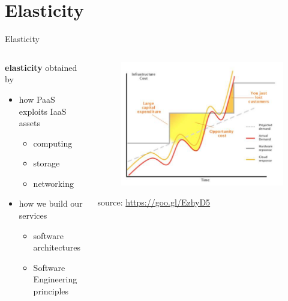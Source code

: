 %
%
\section{Elasticity}
\begin{frame}{Elasticity}
	\begin{columns}
		\begin{column}{0.5\textwidth}
			\textbf{elasticity} obtained by
			\begin{itemize}
				\item{\footnotesize{how PaaS exploits IaaS assets}}
				\begin{itemize}
					\item{\scriptsize{computing}}
					\item{\scriptsize{storage}}
					\item{\scriptsize{networking}}
				\end{itemize}
				\item{\footnotesize{how we build our services}}
				\begin{itemize}
					\item{\scriptsize{software architectures}}
					\item{\scriptsize{Software Engineering principles}}
				\end{itemize}
			\end{itemize}
		\end{column}
		\begin{column}{0.5\textwidth}
			\begin{figure}
				\centering{}
				\includegraphics[scale=0.35]{images/elasticity.png}
			\end{figure}
			\begin{flushright}
				\tiny{source: \url{https://goo.gl/EzhyD5}}
			\end{flushright}
		\end{column}
	\end{columns}
\end{frame}

